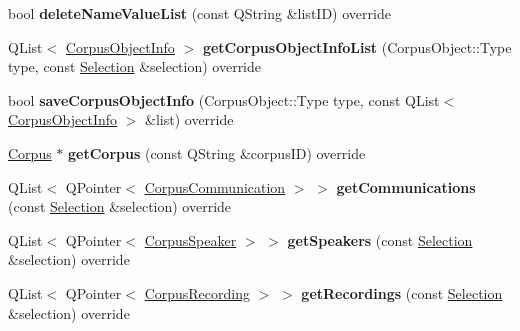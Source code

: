 \begin{DoxyCompactItemize}
bool {\bfseries delete\+Name\+Value\+List} (const Q\+String \&list\+ID) override
\item 
\mbox{\label{class_s_q_l_metadata_datastore_a14a47407b81ca3ea1d91916a1d699b4c}} 
Q\+List$<$ \hyperlink{class_corpus_object_info}{Corpus\+Object\+Info} $>$ {\bfseries get\+Corpus\+Object\+Info\+List} (Corpus\+Object\+::\+Type type, const \hyperlink{class_metadata_datastore_1_1_selection}{Selection} \&selection) override
\item 
\mbox{\label{class_s_q_l_metadata_datastore_ac8db7ddddd46cb54011f6c0832ebc71b}} 
bool {\bfseries save\+Corpus\+Object\+Info} (Corpus\+Object\+::\+Type type, const Q\+List$<$ \hyperlink{class_corpus_object_info}{Corpus\+Object\+Info} $>$ \&list) override
\item 
\mbox{\label{class_s_q_l_metadata_datastore_ae70e0dd152bcecfe58a452e5550ec33d}} 
\hyperlink{class_corpus}{Corpus} $\ast$ {\bfseries get\+Corpus} (const Q\+String \&corpus\+ID) override
\item 
\mbox{\label{class_s_q_l_metadata_datastore_a5869897c3b0fcfbd0e61081fa51f100d}} 
Q\+List$<$ Q\+Pointer$<$ \hyperlink{class_corpus_communication}{Corpus\+Communication} $>$ $>$ {\bfseries get\+Communications} (const \hyperlink{class_metadata_datastore_1_1_selection}{Selection} \&selection) override
\item 
\mbox{\label{class_s_q_l_metadata_datastore_a686cbe3fae4a5ff023ff59027135eb74}} 
Q\+List$<$ Q\+Pointer$<$ \hyperlink{class_corpus_speaker}{Corpus\+Speaker} $>$ $>$ {\bfseries get\+Speakers} (const \hyperlink{class_metadata_datastore_1_1_selection}{Selection} \&selection) override
\item 
\mbox{\label{class_s_q_l_metadata_datastore_ab254d1f5aadcb83b48e3a8b15756bb00}} 
Q\+List$<$ Q\+Pointer$<$ \hyperlink{class_corpus_recording}{Corpus\+Recording} $>$ $>$ {\bfseries get\+Recordings} (const \hyperlink{class_metadata_datastore_1_1_selection}{Selection} \&selection) override
\item 
\mbox{\label{class_s_q_l_metadata_datastore_a629b5efb407dfc4f514a38f835e2f35f}} 

\end{DoxyCompactItemize}
